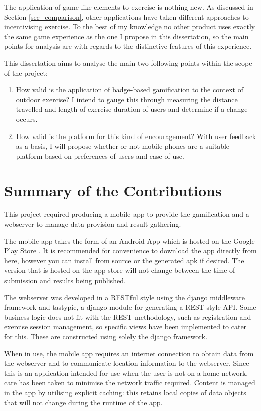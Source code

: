 The application of game like elements to exercise is nothing new. As
discussed in Section \ref{sec_comparison}, other applications have
taken different approaches to incentivising exercise. To the best of
my knowledge no other product uses exactly the same game experience as
the one I propose in this dissertation, so the main points for
analysis are with regards to the distinctive features of this
experience. 

This dissertation aims to analyse the main two following points within
the scope of the project:

\begin{enumerate}
  \item How valid is the application of badge-based gamification to
    the context of outdoor exercise? I intend to gauge this through
    measuring the distance travelled and length of exercise duration
    of users and determine if a change occurs.
  \item How valid is the platform for this kind of encouragement?
    With user feedback as a basis, I will propose whether or not
    mobile phones are a suitable platform based on preferences of
    users and ease of use.
\end{enumerate}

\section{Summary of the Contributions}

This project required producing a mobile app to provide the
gamification and a webserver to manage data provision and result
gathering. 

The mobile app takes the form of an Android App which is hosted on the
Google Play Store \cite{app_store_link}. It is recommended for
convenience to download the app directly from here, however you can
install from source or the generated apk if desired. The version that
is hosted on the app store will not change between the time of
submission and results being published.

The webserver was developed in a RESTful style using the django
middleware framework\cite{django} and tastypie, a django module for
generating a REST style API\cite{tastypie}. Some business logic does
not fit with the REST methodology, such as registration and exercise
session management, so specific views have been implemented to cater
for this. These are constructed using solely the django framework.

When in use, the mobile app requires an internet connection to obtain
data from the webserver and to communicate location information to the
webserver. Since this is an application intended for use when the user
is not on a home network, care has been taken to minimise the network
traffic required. Content is managed in the app by utilising explicit
caching: this retains local copies of data objects that will not
change during the runtime of the app. 

